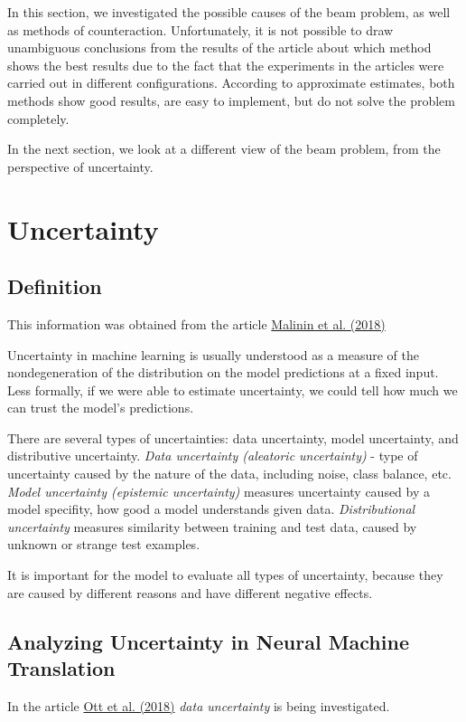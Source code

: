 \documentclass[a4paper,14pt]{extarticle}
\newcommand{\bibref}[3]{\hyperlink{#1}{#2 (#3)}}
\begin{document}
	In this section, we investigated the possible causes of the beam problem, as well as methods of counteraction. Unfortunately, it is not possible to draw unambiguous conclusions from the results of the article about which method shows the best results due to the fact that the experiments in the articles were carried out in different configurations. According to approximate estimates, both methods show good results, are easy to implement, but do not solve the problem completely.
	
	In the next section, we look at a different view of the beam problem, from the perspective of uncertainty.
	
	\section{Uncertainty}
	\subsection{Definition}
	This information was obtained from the article \bibref{prior}{Malinin et al.}{2018}
	
	Uncertainty in machine learning is usually understood as a measure of the nondegeneration of the distribution on the model predictions at a fixed input. Less formally, if we were able to estimate uncertainty, we could tell how much we can trust the model's predictions.
	
	There are several types of uncertainties: data uncertainty, model uncertainty, and distributive uncertainty. \textit{Data uncertainty (aleatoric uncertainty)} - type of uncertainty caused by the nature of the data, including noise, class balance, etc. \textit{Model uncertainty (epistemic uncertainty)}  measures uncertainty caused by a model specifity, how good a model understands given data. \textit{Distributional uncertainty} measures similarity between training and test data, caused by unknown or strange test examples. 
	
	It is important for the model to evaluate all types of uncertainty, because they are caused by different reasons and have different negative effects.
	
	\subsection{Analyzing Uncertainty in Neural Machine Translation}
	In the article \bibref{anal_uncertainty}{Ott et al.}{2018} \textit{data uncertainty} is being investigated.
	
\end{document}
